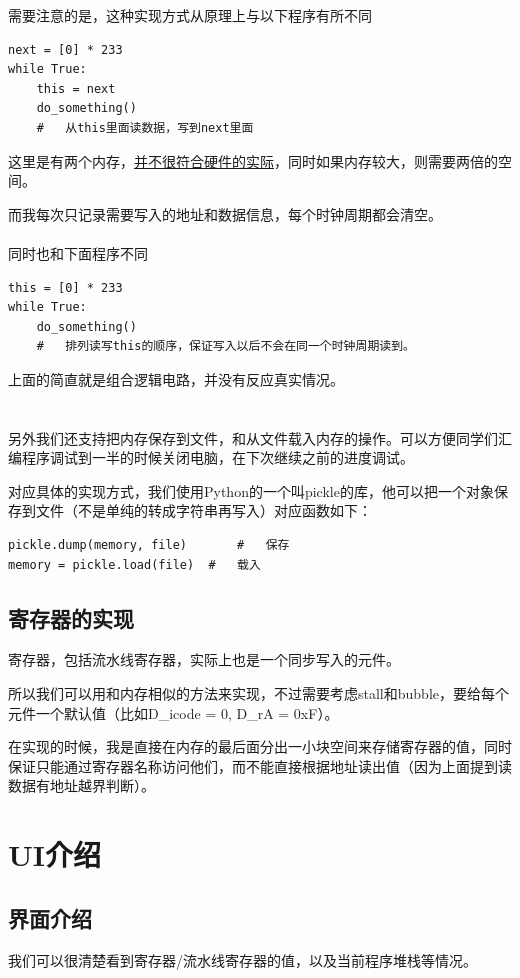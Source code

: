 \documentclass{article}
\begin{document}
需要注意的是，这种实现方式从原理上与以下程序有所不同
\begin{lstlisting}[frame=single]
next = [0] * 233
while True:
	this = next
	do_something()
	#	从this里面读数据，写到next里面
\end{lstlisting}

这里是有两个内存，\underline{并不很符合硬件的实际}，同时如果内存较大，则需要两倍的空间。

而我每次只记录需要写入的地址和数据信息，每个时钟周期都会清空。\\\\
\indent 同时也和下面程序不同
\begin{lstlisting}[frame=single]
this = [0] * 233
while True:
	do_something()
	#	排列读写this的顺序，保证写入以后不会在同一个时钟周期读到。
\end{lstlisting}

上面的简直就是组合逻辑电路，并没有反应真实情况。
\\
\\
\\
\indent 另外我们还支持把内存保存到文件，和从文件载入内存的操作。可以方便同学们汇编程序调试到一半的时候关闭电脑，在下次继续之前的进度调试。

对应具体的实现方式，我们使用Python的一个叫pickle的库，他可以把一个对象保存到文件（不是单纯的转成字符串再写入）对应函数如下：
\begin{lstlisting}[frame=single]
pickle.dump(memory, file)		#	保存
memory = pickle.load(file)	#	载入
\end{lstlisting}

\subsection{寄存器的实现}
寄存器，包括流水线寄存器，实际上也是一个同步写入的元件。

所以我们可以用和内存相似的方法来实现，不过需要考虑stall和bubble，要给每个元件一个默认值（比如D\_icode = 0, D\_rA = 0xF）。

在实现的时候，我是直接在内存的最后面分出一小块空间来存储寄存器的值，同时保证只能通过寄存器名称访问他们，而不能直接根据地址读出值（因为上面提到读数据有地址越界判断）。

\section{UI介绍}
\subsection{界面介绍}
我们可以很清楚看到寄存器/流水线寄存器的值，以及当前程序堆栈等情况。
\end{document}
